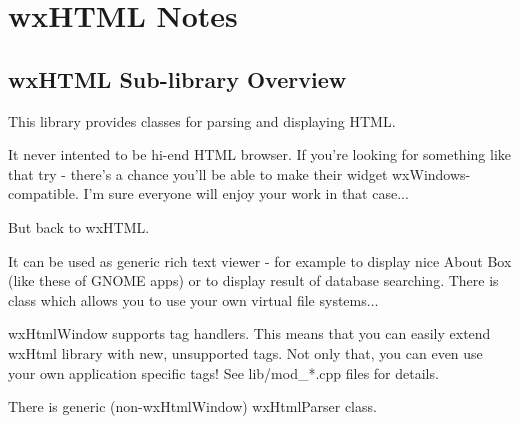\chapter{wxHTML Notes}\label{wxHTML}
%
%
\setfooter{\thepage}{}{}{}{}{\thepage}%

\section{wxHTML Sub-library Overview}\label{wxhtmloverview}

This library provides classes for parsing and displaying HTML.

It never intented to be hi-end HTML browser. If you're looking for
something like that try  - there's a 
chance you'll be able to make their widget wxWindows-compatible. I'm sure
everyone will enjoy your work in that case...

But back to wxHTML. 

It can be used as generic rich text viewer - for example to display 
nice About Box (like these of GNOME apps) or to display result of
database searching. There is  
class which allows you to use your own virtual file systems...

wxHtmlWindow supports tag handlers. This means that you can easily
extend wxHtml library  with new, unsupported tags. Not only that,
you can even use your own application specific tags!
See lib/mod_*.cpp files for details.

There is generic (non-wxHtmlWindow) wxHtmlParser class.



 





